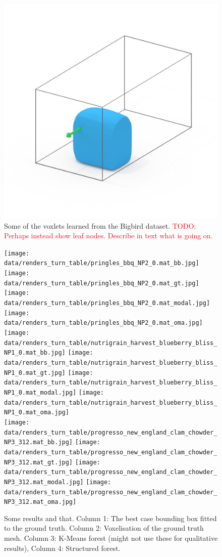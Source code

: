 \documentclass[10pt,twocolumn,letterpaper]{article}
\newcommand{\todo}[1]{\textcolor{red}{TODO: #1}}
\begin{document}
\begin{figure}
     \includegraphics[width=0.32\columnwidth, clip=true, trim=130 150 120 150]{data/all_voxlets_renders_white/44_marching_cubes.jpg}
     \caption{Some of the voxlets learned from the Bigbird dataset. \todo{Perhaps instead show leaf nodes. Describe in text what is going on.}}
\end{figure}


\newcommand\objone[1]{%
}


\begin{figure}
     \texttt{[image: data/renders\_turn\_table/pringles\_bbq\_NP2\_0.mat\_bb.jpg]}
     \texttt{[image: data/renders\_turn\_table/pringles\_bbq\_NP2\_0.mat\_gt.jpg]}
     \texttt{[image: data/renders\_turn\_table/pringles\_bbq\_NP2\_0.mat\_modal.jpg]}
     \texttt{[image: data/renders\_turn\_table/pringles\_bbq\_NP2\_0.mat\_oma.jpg]} \\
    \texttt{[image: data/renders\_turn\_table/nutrigrain\_harvest\_blueberry\_bliss\_NP1\_0.mat\_bb.jpg]}
     \texttt{[image: data/renders\_turn\_table/nutrigrain\_harvest\_blueberry\_bliss\_NP1\_0.mat\_gt.jpg]}
     \texttt{[image: data/renders\_turn\_table/nutrigrain\_harvest\_blueberry\_bliss\_NP1\_0.mat\_modal.jpg]}
     \texttt{[image: data/renders\_turn\_table/nutrigrain\_harvest\_blueberry\_bliss\_NP1\_0.mat\_oma.jpg]} \\
      \texttt{[image: data/renders\_turn\_table/progresso\_new\_england\_clam\_chowder\_NP3\_312.mat\_bb.jpg]}
     \texttt{[image: data/renders\_turn\_table/progresso\_new\_england\_clam\_chowder\_NP3\_312.mat\_gt.jpg]}
     \texttt{[image: data/renders\_turn\_table/progresso\_new\_england\_clam\_chowder\_NP3\_312.mat\_modal.jpg]}
     \texttt{[image: data/renders\_turn\_table/progresso\_new\_england\_clam\_chowder\_NP3\_312.mat\_oma.jpg]} 
     \caption{Some results and that. Column 1: The best case bounding box fitted to the ground truth. Column 2: Voxelisation of the ground truth mesh. Column 3: K-Means forest (might not use these for qualitative results), Column 4: Structured forest.}
\end{figure}
\end{document}

